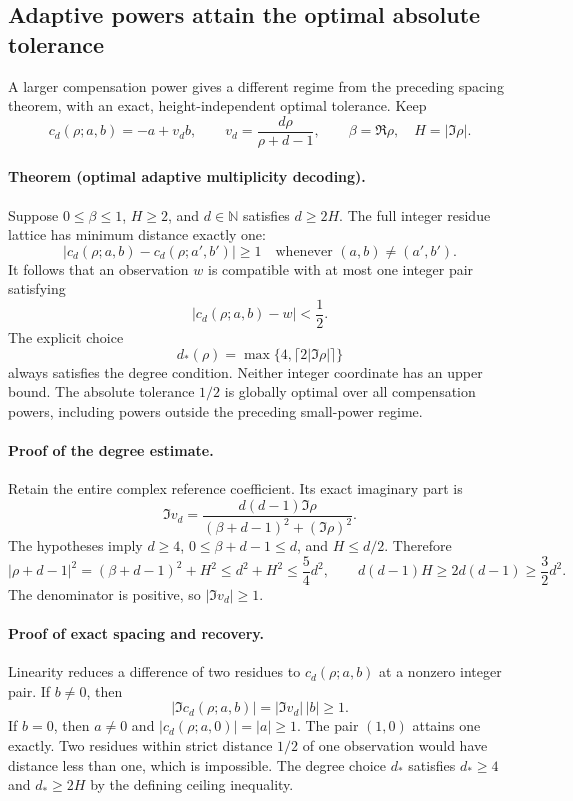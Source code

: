 \subsection{Adaptive powers attain the optimal absolute tolerance}
\label{sec:adaptive-multiplicity-decoding}

A larger compensation power gives a different regime from the preceding
spacing theorem, with an exact, height-independent optimal tolerance. Keep
\[
 c_d(\rho;a,b)=-a+v_db,\qquad
 v_d=\frac{d\rho}{\rho+d-1},\qquad
 \beta=\Re\rho,\quad H=|\Im\rho|.
\]

\paragraph{Theorem (optimal adaptive multiplicity decoding).}
Suppose \(0\le\beta\le1\), \(H\ge2\), and \(d\in\mathbb N\) satisfies
\(d\ge2H\). The full integer residue lattice has minimum distance exactly
one:
\[
 |c_d(\rho;a,b)-c_d(\rho;a',b')|\ge1
 \quad\text{whenever }(a,b)\ne(a',b').
\]
It follows that an observation \(w\) is compatible with at most one
integer pair satisfying
\[
 |c_d(\rho;a,b)-w|<\frac12.
\]
The explicit choice
\[
 d_*(\rho)=\max\{4,\lceil2|\Im\rho|\rceil\}
\]
always satisfies the degree condition. Neither integer coordinate has an
upper bound. The absolute tolerance \(1/2\) is globally optimal over all
compensation powers, including powers outside the preceding small-power
regime.

\paragraph{Proof of the degree estimate.}
Retain the entire complex reference coefficient. Its exact imaginary part is
\[
 \Im v_d=\frac{d(d-1)\Im\rho}
                 {(\beta+d-1)^2+(\Im\rho)^2}.
\]
The hypotheses imply \(d\ge4\), \(0\le\beta+d-1\le d\), and \(H\le d/2\).
Therefore
\[
 |\rho+d-1|^2
   =(\beta+d-1)^2+H^2
   \le d^2+H^2
   \le\frac54d^2,
 \qquad
 d(d-1)H\ge2d(d-1)\ge\frac32d^2.
\]
The denominator is positive, so \(|\Im v_d|\ge1\).

\paragraph{Proof of exact spacing and recovery.}
Linearity reduces a difference of two residues to
\(c_d(\rho;a,b)\) at a nonzero integer pair. If \(b\ne0\), then
\[
 |\Im c_d(\rho;a,b)|=|\Im v_d|\,|b|\ge1.
\]
If \(b=0\), then \(a\ne0\) and
\(|c_d(\rho;a,0)|=|a|\ge1\). The pair \((1,0)\) attains one exactly.
Two residues within strict distance \(1/2\) of one observation would
have distance less than one, which is impossible. The degree choice
\(d_*\) satisfies \(d_*\ge4\) and \(d_*\ge2H\) by the defining ceiling
inequality.

